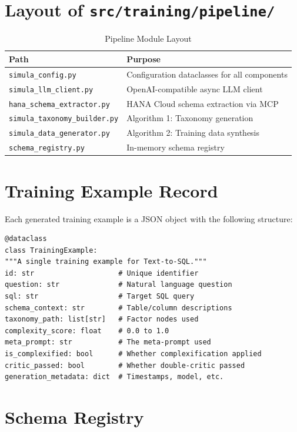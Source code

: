 \documentclass[12pt,a4paper,twoside]{report}
\begin{document}
\section{Layout of \texttt{src/training/pipeline/}}

\begin{table}[H]
\centering
\caption{Pipeline Module Layout}
\label{tab:module-layout}
\begin{tabularx}{\textwidth}{lX}
\toprule
\textbf{Path} & \textbf{Purpose} \\
\midrule
\texttt{simula\_config.py} & Configuration dataclasses for all components \\
\texttt{simula\_llm\_client.py} & OpenAI-compatible async LLM client \\
\texttt{hana\_schema\_extractor.py} & HANA Cloud schema extraction via MCP \\
\texttt{simula\_taxonomy\_builder.py} & Algorithm 1: Taxonomy generation \\
\texttt{simula\_data\_generator.py} & Algorithm 2: Training data synthesis \\
\texttt{schema\_registry.py} & In-memory schema registry \\
\bottomrule
\end{tabularx}
\end{table}

\section{Training Example Record}

Each generated training example is a JSON object with the following structure:

\begin{lstlisting}[language=jsonx,caption={TrainingExample dataclass (simula\_data\_generator.py)}]
@dataclass
class TrainingExample:
"""A single training example for Text-to-SQL."""
id: str                    # Unique identifier
question: str              # Natural language question
sql: str                   # Target SQL query
schema_context: str        # Table/column descriptions
taxonomy_path: list[str]   # Factor nodes used
complexity_score: float    # 0.0 to 1.0
meta_prompt: str           # The meta-prompt used
is_complexified: bool      # Whether complexification applied
critic_passed: bool        # Whether double-critic passed
generation_metadata: dict  # Timestamps, model, etc.
\end{lstlisting}

\section{Schema Registry}
\end{document}
